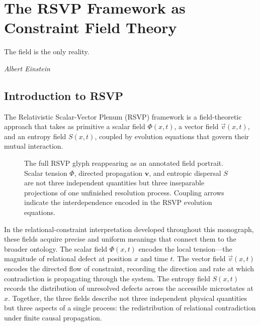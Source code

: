 \documentclass[12pt,a4paper,openany]{book}
\theoremstyle{plain}
\theoremstyle{definition}
\theoremstyle{remark}
\newcommand{\Entropy}{S}
\newcommand{\scalar}{\Phi}
\newcommand{\kvec}{\vec{v}}
\newcommand{\RSVPContours}[2]{%
  \foreach \r in {0.45,0.90,1.35,1.80}{%
    \draw[rsvp scalar] (#1,#2) circle (\r);}}
\newcommand{\RSVPFlowRing}[3]{%
  \foreach \ang in {0,45,...,315}{%
    \draw[rsvp flow]
      ({#1 + #3*cos(\ang)},{#2 + #3*sin(\ang)})
      -- ++({-0.35*sin(\ang)},{0.35*cos(\ang)});}}
\newcommand{\RSVPEntropyRays}[3]{%
  \foreach \ang in {0,60,...,300}{%
    \draw[rsvp entropy]
      (#1,#2) -- ({#1 + #3*cos(\ang)},{#2 + #3*sin(\ang)});}}
\newcommand{\RSVPMasterGlyph}[2]{%
  \RSVPContours{#1}{#2}%
  \RSVPFlowRing{#1}{#2}{1.10}%
  \RSVPEntropyRays{#1}{#2}{2.00}%
  \fill[blue!80] (#1,#2) circle (0.045);}
\begin{document}
\chapter{The RSVP Framework as Constraint Field Theory}

\epigraph{%
  The field is the only reality.
}{%
  \textit{Albert Einstein}}

\section{Introduction to RSVP}

The Relativistic Scalar-Vector Plenum (RSVP) framework is a field-theoretic approach that takes as primitive a scalar field $\scalar(x, t)$, a vector field $\kvec(x, t)$, and an entropy field $\Entropy(x, t)$, coupled by evolution equations that govern their mutual interaction.

\begin{figure}[h]
\centering
{}
\caption[RSVP field portrait, Chapter~12]{The full RSVP glyph reappearing as an annotated field portrait. Scalar tension $\Phi$, directed propagation $\mathbf{v}$, and entropic dispersal $S$ are not three independent quantities but three inseparable projections of one unfinished resolution process. Coupling arrows indicate the interdependence encoded in the RSVP evolution equations.}
\label{fig:glyph_rsvp}
\end{figure}

In the relational-constraint interpretation developed throughout this monograph, these fields acquire precise and uniform meanings that connect them to the broader ontology. The scalar field $\scalar(x, t)$ encodes the local tension---the magnitude of relational defect at position $x$ and time $t$. The vector field $\kvec(x, t)$ encodes the directed flow of constraint, recording the direction and rate at which contradiction is propagating through the system. The entropy field $\Entropy(x, t)$ records the distribution of unresolved defects across the accessible microstates at $x$. Together, the three fields describe not three independent physical quantities but three aspects of a single process: the redistribution of relational contradiction under finite causal propagation.
\end{document}
